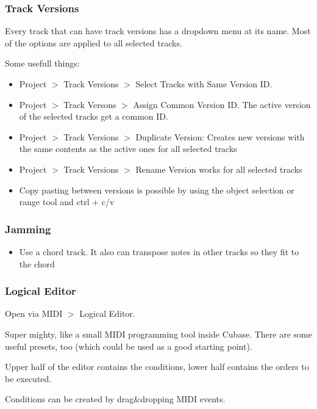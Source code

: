 \documentclass[10pt]{article}
\begin{document}
\subsubsection{Track Versions}

Every track that can have track versions has a dropdown menu at its name. Most of the options are applied to all selected tracks.

Some usefull things:

\begin{itemize}
	\item Project $>$ Track Versions $>$ Select Tracks with Same Version ID.
	\item Project $>$ Track Versons $>$ Assign Common Version ID. The active version of the selected tracks get a common ID.
	\item Project $>$ Track Versions $>$ Duplicate Version: Creates new versions with the same contents as the active ones for all selected tracks
	\item Project $>$ Track Versions $>$ Rename Version works for all selected tracks
	\item Copy pasting between versions is possible by using the object selection or range tool and ctrl + c/v
\end{itemize}

\subsubsection{Jamming}

\begin{itemize}
	\item Use a chord track. It also can transpose notes in other tracks so they fit to the chord
\end{itemize}

\subsubsection{Logical Editor}\hypertarget{LogicalEditor}{}

Open via MIDI $>$ Logical Editor.

Super mighty, like a small MIDI programming tool inside Cubase. There are some useful presets, too (which could be used as a good starting point).

Upper half of the editor contains the conditions, lower half contains the orders to be executed.

Conditions can be created by drag\&dropping MIDI events.
\end{document}
